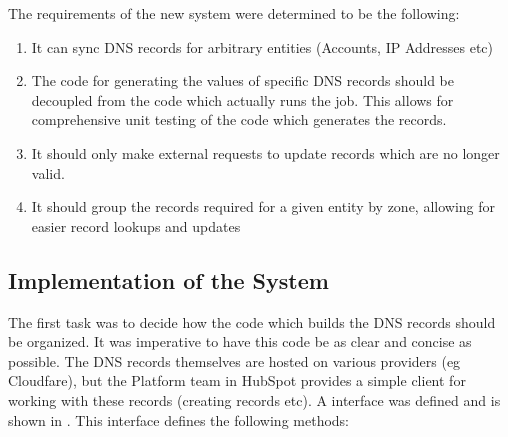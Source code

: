 The requirements of the new system were determined to be the following:
\begin{enumerate}
      \item{It can sync DNS records for arbitrary entities (Accounts, IP Addresses etc)}
      \item{The code for generating the values of specific DNS records should be decoupled from the code which actually runs the job. This allows for comprehensive unit testing of the code which generates the records.}
      \item{It should only make external requests to update records which are no longer valid.}
      \item{It should group the records required for a given entity by zone, allowing for easier record lookups and updates}
\end{enumerate}

\subsection{Implementation of the System}
The first task was to decide how the code which builds the DNS records should be organized. It was imperative to have this code be as clear and concise as possible. The DNS records themselves are hosted on various providers (eg Cloudfare), but the Platform team in HubSpot provides a simple client for working with these records (creating records etc). A  interface was defined and is shown in  . This interface defines the following methods:

